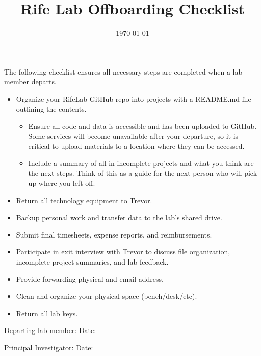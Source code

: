 \documentclass[letterpaper,12pt]{article}
\begin{document}
\title{Rife Lab Offboarding Checklist}
\date{\today}
\maketitle

\noindent The following checklist ensures all necessary steps are completed when a lab member departs.

\begin{itemize}[label=$\square$, leftmargin=*]
  \item Organize your RifeLab GitHub repo into projects with a README.md file outlining the contents.
    \begin{itemize}[label=$\circ$, leftmargin=2em]
      \item Ensure all code and data is accessible and has been uploaded to GitHub. Some services will become unavailable after your departure, so it is critical to upload materials to a location where they can be accessed.
      \item Include a summary of all in incomplete projects and what you think are the next steps. Think of this as a guide for the next person who will pick up where you left off.
    \end{itemize}
  \item Return all technology equipment to Trevor.
  \item Backup personal work and transfer data to the lab's shared drive.
  \item Submit final timesheets, expense reports, and reimbursements.
  \item Participate in exit interview with Trevor to discuss file organization, incomplete project summaries, and lab feedback.
  \item Provide forwarding physical and email address.
  \item Clean and organize your physical space (bench/desk/etc).
  \item Return all lab keys.
\end{itemize}

\vspace{2em}

\noindent Departing lab member: \underline{\hspace{6cm}} \hfill Date: \underline{\hspace{3cm}}

\vspace{2em}

\noindent Principal Investigator: \underline{\hspace{6cm}} \hfill Date: \underline{\hspace{3cm}}
\end{document}
